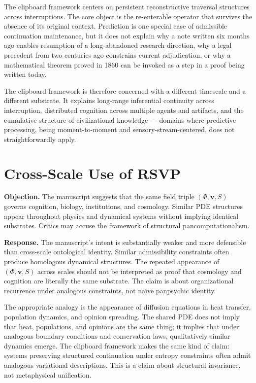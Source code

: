 \documentclass[12pt,oneside]{book}
\theoremstyle{plain}
\theoremstyle{definition}
\theoremstyle{plain}
\begin{document}
The clipboard framework centers on persistent reconstructive traversal structures across interruptions. The core object is the re-enterable operator that survives the absence of its original context. Prediction is one special case of admissible continuation maintenance, but it does not explain why a note written six months ago enables resumption of a long-abandoned research direction, why a legal precedent from two centuries ago constrains current adjudication, or why a mathematical theorem proved in 1860 can be invoked as a step in a proof being written today.

The clipboard framework is therefore concerned with a different timescale and a different substrate. It explains long-range inferential continuity across interruption, distributed cognition across multiple agents and artifacts, and the cumulative structure of civilizational knowledge — domains where predictive processing, being moment-to-moment and sensory-stream-centered, does not straightforwardly apply.

\section{Cross-Scale Use of RSVP}

\textbf{Objection.} The manuscript suggests that the same field triple $(\Phi, \mathbf{v}, S)$ governs cognition, biology, institutions, and cosmology. Similar PDE structures appear throughout physics and dynamical systems without implying identical substrates. Critics may accuse the framework of structural pancomputationalism.

\textbf{Response.} The manuscript's intent is substantially weaker and more defensible than cross-scale ontological identity. Similar admissibility constraints often produce homologous dynamical structures. The repeated appearance of $(\Phi, \mathbf{v}, S)$ across scales should not be interpreted as proof that cosmology and cognition are literally the same substrate. The claim is about organizational recurrence under analogous constraints, not naïve panpsychic identity.

The appropriate analogy is the appearance of diffusion equations in heat transfer, population dynamics, and opinion spreading. The shared PDE does not imply that heat, populations, and opinions are the same thing; it implies that under analogous boundary conditions and conservation laws, qualitatively similar dynamics emerge. The clipboard framework makes the same kind of claim: systems preserving structured continuation under entropy constraints often admit analogous variational descriptions. This is a claim about structural invariance, not metaphysical unification.
\end{document}
